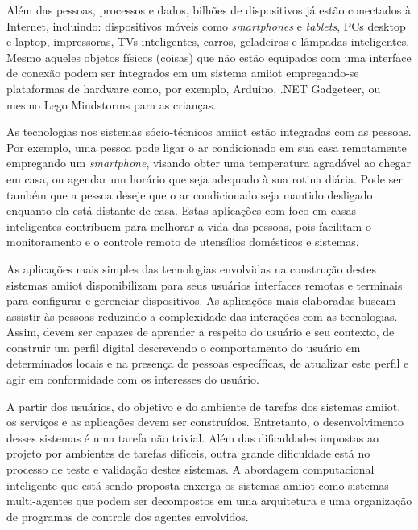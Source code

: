     Além das pessoas, processos e dados, bilhões de dispositivos já estão conectados à Internet, incluindo: dispositivos móveis como \textit{smartphones} e \textit{tablets}, PCs desktop e laptop, impressoras, TVs inteligentes, carros, geladeiras e lâmpadas inteligentes. Mesmo aqueles objetos físicos (coisas) que não estão equipados com uma interface de conexão podem ser integrados em um sistema \acrshort{amiiot} empregando-se plataformas de hardware como, por exemplo, Arduino, .NET Gadgeteer, ou mesmo Lego Mindstorms para as crianças.

    As tecnologias nos sistemas sócio-técnicos \acrshort{amiiot} estão integradas com as pessoas. Por exemplo, uma pessoa pode ligar o ar condicionado em sua casa remotamente empregando um \textit{smartphone}, visando obter uma temperatura agradável ao chegar em casa, ou agendar um horário que seja adequado à sua rotina diária. Pode ser também que a pessoa deseje que o ar condicionado seja mantido desligado enquanto ela está distante de casa. Estas aplicações com foco em casas inteligentes contribuem para melhorar a vida das pessoas, pois facilitam o monitoramento e o controle remoto de utensílios domésticos e sistemas.

    As aplicações mais simples das tecnologias envolvidas na construção destes sistemas \acrshort{amiiot} disponibilizam para seus usuários interfaces remotas e terminais para configurar e gerenciar dispositivos. As aplicações mais elaboradas buscam assistir às pessoas reduzindo a complexidade das interações com as tecnologias. Assim, devem ser capazes de aprender a respeito do usuário e seu contexto, de construir um perfil digital descrevendo o comportamento do usuário em determinados locais e na presença de pessoas específicas, de atualizar este perfil e agir em conformidade com os interesses do usuário.
    
    
    A partir dos usuários, do objetivo e do ambiente de tarefas dos sistemas \acrshort{amiiot}, os serviços e as aplicações devem ser construídos. Entretanto, o desenvolvimento desses sistemas é uma tarefa não trivial. Além das dificuldades impostas ao projeto por ambientes de tarefas difíceis, outra grande dificuldade está no processo de teste e validação destes sistemas. A abordagem computacional inteligente que está sendo proposta enxerga os sistemas \acrshort{amiiot} como sistemas multi-agentes que podem ser decompostos em uma arquitetura e uma organização de programas de controle dos agentes envolvidos. 

